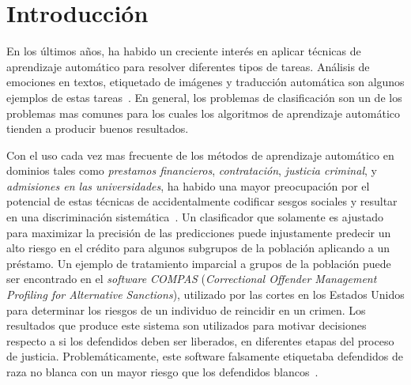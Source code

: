 \chapter*{Introducción}\label{chapter:introduction}



En los últimos años, ha habido un creciente interés en aplicar técnicas de aprendizaje automático para resolver diferentes tipos de tareas.
Análisis de emociones en textos, etiquetado de imágenes y traducción automática son algunos ejemplos de estas tareas~\parencite{bahdanau2014neural,ucidata,mnih2013machine,yavuz2022comparison}.
En general, los problemas de clasificación son un de los problemas mas comunes para los cuales los algoritmos de aprendizaje automático tienden a producir buenos resultados.


Con el uso cada vez mas frecuente de los métodos de aprendizaje automático en dominios tales como \emph{prestamos financieros}, \emph{contratación}, \emph{justicia criminal}, y \emph{admisiones en las universidades}, ha habido una mayor preocupación por el potencial de estas técnicas de accidentalmente codificar sesgos sociales y resultar en una discriminación sistemática~\parencite{prorepublica2016bias,barocas-hardt-narayanan,NIPS2016_a486cd07,Buolamwini2018GenderSI,caliskan2017semantics}.
Un clasificador que solamente es ajustado para maximizar la precisión de las predicciones puede injustamente predecir un alto riesgo en el crédito para algunos subgrupos de la población aplicando a un préstamo.
Un ejemplo de tratamiento imparcial a grupos de la población puede ser encontrado en el \emph{software} \emph{COMPAS} (\emph{Correctional Offender Management Profiling for Alternative Sanctions}), utilizado por las cortes en los Estados Unidos para determinar los riesgos de un individuo de reincidir en un crimen.
Los resultados que produce este sistema son utilizados para motivar decisiones respecto a si los defendidos deben ser liberados, en diferentes etapas del proceso de justicia.
Problemáticamente, este software falsamente etiquetaba defendidos de raza no blanca con un mayor riesgo que los defendidos blancos~\parencite{prorepublica2016bias}.


